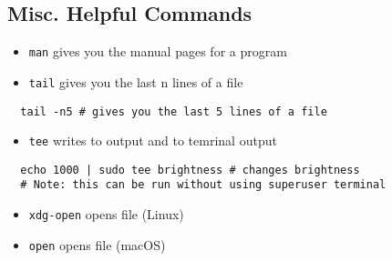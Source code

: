 \documentclass[letterpaper,12pt]{article}
\begin{document}
\subsection{Misc. Helpful Commands}

\begin{itemize}
 \item \lstinline{man} gives you the manual pages for a program
 \item \lstinline{tail} gives you the last n lines of a file
\end{itemize}

\begin{lstlisting}
  tail -n5 # gives you the last 5 lines of a file
\end{lstlisting}

\begin{itemize}
 \item \lstinline{tee} writes to output and to temrinal output
\end{itemize}

\begin{lstlisting}
  echo 1000 | sudo tee brightness # changes brightness
  # Note: this can be run without using superuser terminal
\end{lstlisting}

\begin{itemize}
 \item \lstinline{xdg-open} opens file (Linux)
 \item \lstinline{open} opens file (macOS)
\end{itemize}
\end{document}
